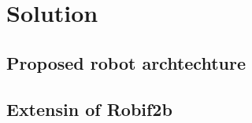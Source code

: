 \documentclass[report.tex]{subfiles}
\begin{document}
    \chapter{Solution}


    \section{Proposed robot archtechture}

    \section{Extensin of Robif2b}
\end{document}
